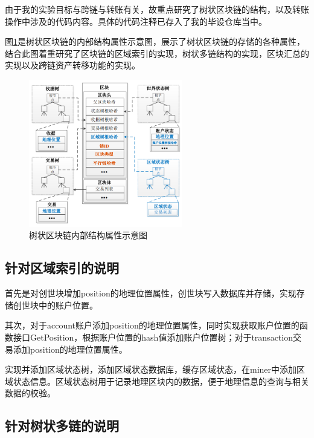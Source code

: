 由于我的实验目标与跨链与转账有关，故重点研究了树状区块链的结构，以及转账操作中涉及的代码内容。具体的代码注释已存入了我的毕设仓库当中。

图\ref{fig:树状区块链内部结构属性示意图}是树状区块链的内部结构属性示意图，展示了树状区块链的存储的各种属性，结合此图着重研究了区块链的区域索引的实现，树状多链结构的实现，区块汇总的实现以及跨链资产转移功能的实现。

\begin{figure}
	\centering
	\includegraphics[width=0.6\textwidth]{figures/树状区块链结构属性示意图.png}
	\caption{树状区块链内部结构属性示意图}
	\label{fig:树状区块链内部结构属性示意图}
\end{figure}

\subsection{针对区域索引的说明}

首先是对创世块增加position的地理位置属性，创世块写入数据库并存储，实现存储创世块中的账户位置。

其次，对于account账户添加position的地理位置属性，同时实现获取账户位置的函数接口GetPosition，根据账户位置的hash值添加账户位置树；对于transaction交易添加position的地理位置属性。

实现并添加区域状态树，添加区域状态数据库，缓存区域状态，在miner中添加区域状态信息。区域状态树用于记录地理区块内的数据，便于地理信息的查询与相关数据的校验。

\subsection{针对树状多链的说明}


